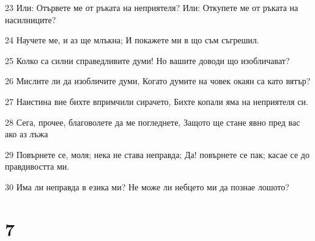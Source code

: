 \par 23 Или: Отървете ме от ръката на неприятеля? Или: Откупете ме от ръката на насилниците?
\par 24 Научете ме, и аз ще млъкна; И покажете ми в що съм съгрешил.
\par 25 Колко са силни справедливите думи! Но вашите доводи що изобличават?
\par 26 Мислите ли да изобличите думи, Когато думите на човек окаян са като вятър?
\par 27 Наистина вие бихте впримчили сирачето, Бихте копали яма на неприятеля си.
\par 28 Сега, прочее, благоволете да ме погледнете, Защото ще стане явно пред вас ако аз лъжа
\par 29 Повърнете се, моля; нека не става неправда; Да! повърнете се пак; касае се до правдивостта ми.
\par 30 Има ли неправда в езика ми? Не може ли небцето ми да познае лошото?

\chapter{7}

